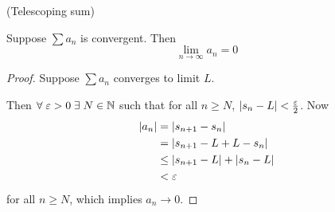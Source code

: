 \begin{rem}
    (Telescoping sum)
\end{rem}

\begin{thm} \label{thm:series:vanishing_test}
    Suppose $\sum a_{n}$ is convergent. Then \[
        \lim_{n \to \infty} a_{n} = 0
    \]
\end{thm}
\begin{proof}
    Suppose $\sum a_{n}$ converges to limit $L$.

    Then $\forall\; \varepsilon > 0 \;\exists\; N \in \mathbb{N}$ such that for all $n \geq N$, $\abs{s_{n} - L} < \frac{\varepsilon}{2}$. Now
    \begin{align*}
        \abs{a_{n}} &= \abs{s_{n+1} - s_{n}} \\
        &= \abs{s_{n+1} - L + L - s_{n}} \\
        &\leq \abs{s_{n+1} - L} + \abs{s_{n} - L} \\
        &< \varepsilon
    \end{align*}
    for all $n \geq N$, which implies $a_{n} \to 0$.
\end{proof}
